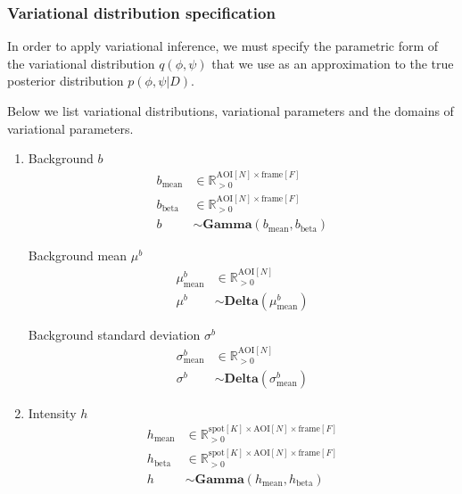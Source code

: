 \subsubsection*{Variational distribution specification}

In order to apply variational inference, we must specify the parametric form of the variational distribution $q(\phi, \psi)$
that we use as an approximation to the true posterior distribution $p(\phi, \psi | D)$.

Below we list variational distributions, variational parameters and the domains of variational parameters.

\begin{enumerate}
\item Background $b$
\begin{subequations}
\begin{align}
    b_\mathrm{mean} &\in \mathbb{R}_{>0}^{\mathrm{AOI}[N] \times \mathrm{frame}[F]} \\
    b_\mathrm{beta} &\in \mathbb{R}_{>0}^{\mathrm{AOI}[N] \times \mathrm{frame}[F]} \\
    b &\sim \mathbf{Gamma}(b_\mathrm{mean}, b_\mathrm{beta})
\end{align}
\end{subequations}

Background mean $\mu^b$
\begin{subequations}
\begin{align}
    \mu^b_\mathrm{mean} &\in \mathbb{R}_{>0}^{\mathrm{AOI}[N]} \\
    \mu^b &\sim \mathbf{Delta}(\mu^b_\mathrm{mean})
\end{align}
\end{subequations}

Background standard deviation $\sigma^b$
\begin{subequations}
\begin{align}
    \sigma^b_\mathrm{mean} &\in \mathbb{R}_{>0}^{\mathrm{AOI}[N]} \\
    \sigma^b &\sim \mathbf{Delta}(\sigma^b_\mathrm{mean})
\end{align}
\end{subequations}

\item Intensity $h$
\begin{subequations}
\begin{align}
    h_\mathrm{mean} &\in \mathbb{R}_{>0}^{\mathrm{spot}[K] \times \mathrm{AOI}[N] \times \mathrm{frame}[F]} \\
    h_\mathrm{beta} &\in \mathbb{R}_{>0}^{\mathrm{spot}[K] \times \mathrm{AOI}[N] \times \mathrm{frame}[F]} \\
    h &\sim \mathbf{Gamma}(h_\mathrm{mean}, h_\mathrm{beta})
\end{align}
\end{subequations}


\end{enumerate}
